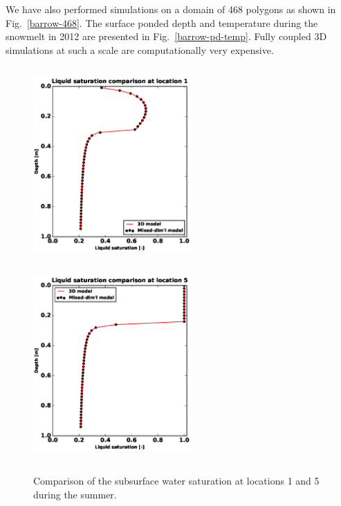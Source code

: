\documentclass[review]{elsarticle}
\begin{document}
We have also performed simulations on a domain of 468 polygons as shown in Fig.~\ref{barrow-468}. The surface ponded depth and temperature during the snowmelt in 2012 are presented in Fig.~\ref{barrow-pd-temp}. Fully coupled 3D simulations at such a scale are computationally very expensive.



 \begin{figure}[!htpb]
\centering
\includegraphics[height = 7.5cm, width=6cm]{figures/comparison/regular/ss-sat/comp-sat-loc1-cycle0020.eps}
\includegraphics[height = 7.5cm, width=6cm]{figures/comparison/regular/ss-sat/comp-sat-loc5-cycle0020.eps}
\caption{Comparison of the subsurface water saturation at locations 1 and 5 during the summer.}
\label{ss-sat-comp}
\end{figure}
\end{document}
